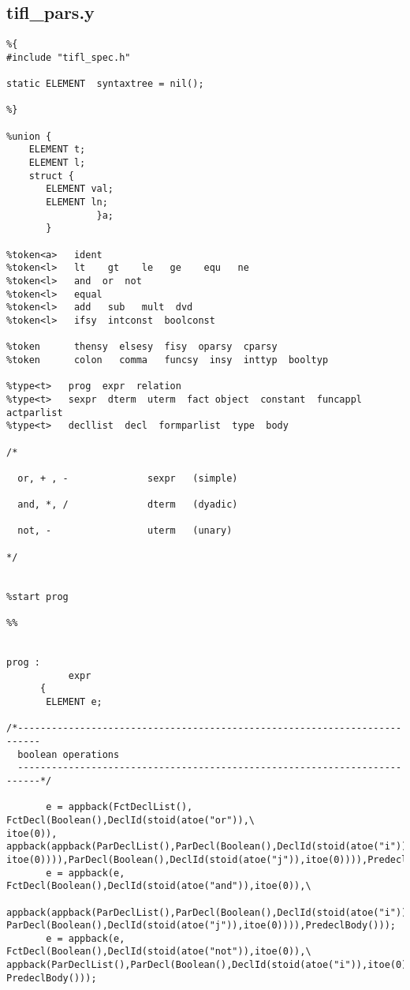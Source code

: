 \subsection{tifl\_pars.y}
\begin{verbatim}
%{
#include "tifl_spec.h"

static ELEMENT  syntaxtree = nil();

%}

%union {
    ELEMENT t;
    ELEMENT l;
    struct {
       ELEMENT val;
       ELEMENT ln;
                }a;
       }

%token<a>   ident 
%token<l>   lt    gt    le   ge    equ   ne 
%token<l>   and  or  not 
%token<l>   equal  
%token<l>   add   sub   mult  dvd 
%token<l>   ifsy  intconst  boolconst 

%token      thensy  elsesy  fisy  oparsy  cparsy  
%token      colon   comma   funcsy  insy  inttyp  booltyp 

%type<t>   prog  expr  relation  
%type<t>   sexpr  dterm  uterm  fact object  constant  funcappl  actparlist
%type<t>   decllist  decl  formparlist  type  body

/*

  or, + , -              sexpr   (simple)

  and, *, /              dterm   (dyadic)

  not, -                 uterm   (unary)

*/


%start prog

%%


prog :
           expr   
      {
       ELEMENT e;

/*--------------------------------------------------------------------------
  boolean operations 
  --------------------------------------------------------------------------*/

       e = appback(FctDeclList(), FctDecl(Boolean(),DeclId(stoid(atoe("or")),\
itoe(0)), appback(appback(ParDeclList(),ParDecl(Boolean(),DeclId(stoid(atoe("i")),\
itoe(0)))),ParDecl(Boolean(),DeclId(stoid(atoe("j")),itoe(0)))),PredeclBody()));
       e = appback(e, FctDecl(Boolean(),DeclId(stoid(atoe("and")),itoe(0)),\
 appback(appback(ParDeclList(),ParDecl(Boolean(),DeclId(stoid(atoe("i")),itoe(0)))),\
ParDecl(Boolean(),DeclId(stoid(atoe("j")),itoe(0)))),PredeclBody()));
       e = appback(e, FctDecl(Boolean(),DeclId(stoid(atoe("not")),itoe(0)),\
appback(ParDeclList(),ParDecl(Boolean(),DeclId(stoid(atoe("i")),itoe(0)))),\
PredeclBody()));



\end{verbatim}
